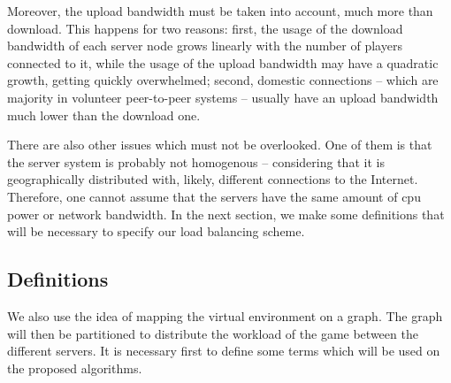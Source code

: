Moreover, the upload bandwidth must be taken into account, much more than download. This happens for two reasons: first, the usage of the download bandwidth of each server node grows linearly with the number of players connected to it, while the usage of the upload bandwidth may have a quadratic growth, getting quickly overwhelmed; second, domestic connections -- which are majority in volunteer peer-to-peer systems -- usually have an upload bandwidth much lower than the download one.

There are also other issues which must not be overlooked. One of them is that the server system is probably not homogenous -- considering that it is geographically distributed with, likely, different connections to the Internet. Therefore, one cannot assume that the servers have the same amount of cpu power or network bandwidth. %
In the next section, we make some definitions that will be necessary to specify our load balancing scheme.


	

\subsection{Definitions}
\label{sec:def}

We also use the idea of mapping the virtual environment on a graph. The graph will then be partitioned to distribute the workload of the game between the different servers. It is necessary first to define some terms which will be used on the proposed algorithms.

